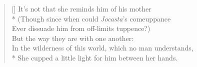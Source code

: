 \settowidth{\versewidth}{In the wilderness of this world, which no man understands,}
\begin{verse}[\versewidth]
    \vin It's not that she reminds him of his mother\\*
    \vin \vin (Though since when could \textit{Jocasta}'s comeuppance\\
    \vin \vin Ever dissuade him from off-limits tuppence?)\\
    \vin But the way they are with one another:\\
    In the wilderness of this world, which no man understands,\\*
    She cupped a little light for him between her hands.
\end{verse}
